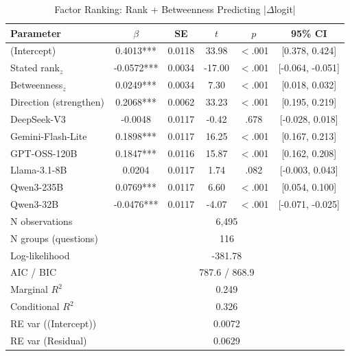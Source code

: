 \begin{table}[htbp]
\centering
\small
\caption{Factor Ranking: Rank + Betweenness Predicting |$\Delta$logit|}
\label{tab:lme_ranking_combined_table}
\begin{tabular}{lccccc}
\toprule
Parameter & $\beta$ & SE & $t$ & $p$ & 95\% CI \\
\midrule
  (Intercept) & 0.4013*** & 0.0118 & 33.98 & $<$.001 & [0.378, 0.424] \\
  Stated rank$_z$ & -0.0572*** & 0.0034 & -17.00 & $<$.001 & [-0.064, -0.051] \\
  Betweenness$_z$ & 0.0249*** & 0.0034 & 7.30 & $<$.001 & [0.018, 0.032] \\
  Direction (strengthen) & 0.2068*** & 0.0062 & 33.23 & $<$.001 & [0.195, 0.219] \\
  DeepSeek-V3 & -0.0048 & 0.0117 & -0.42 & .678 & [-0.028, 0.018] \\
  Gemini-Flash-Lite & 0.1898*** & 0.0117 & 16.25 & $<$.001 & [0.167, 0.213] \\
  GPT-OSS-120B & 0.1847*** & 0.0116 & 15.87 & $<$.001 & [0.162, 0.208] \\
  Llama-3.1-8B & 0.0204 & 0.0117 & 1.74 & .082 & [-0.003, 0.043] \\
  Qwen3-235B & 0.0769*** & 0.0117 & 6.60 & $<$.001 & [0.054, 0.100] \\
  Qwen3-32B & -0.0476*** & 0.0117 & -4.07 & $<$.001 & [-0.071, -0.025] \\
\midrule
  N observations & \multicolumn{5}{c}{6{,}495} \\
  N groups (questions) & \multicolumn{5}{c}{116} \\
  Log-likelihood & \multicolumn{5}{c}{-381.78} \\
  AIC / BIC & \multicolumn{5}{c}{787.6 / 868.9} \\
  Marginal $R^2$ & \multicolumn{5}{c}{0.249} \\
  Conditional $R^2$ & \multicolumn{5}{c}{0.326} \\
  RE var ((Intercept)) & \multicolumn{5}{c}{0.0072} \\
  RE var (Residual) & \multicolumn{5}{c}{0.0629} \\
\bottomrule
\end{tabular}
\end{table}
